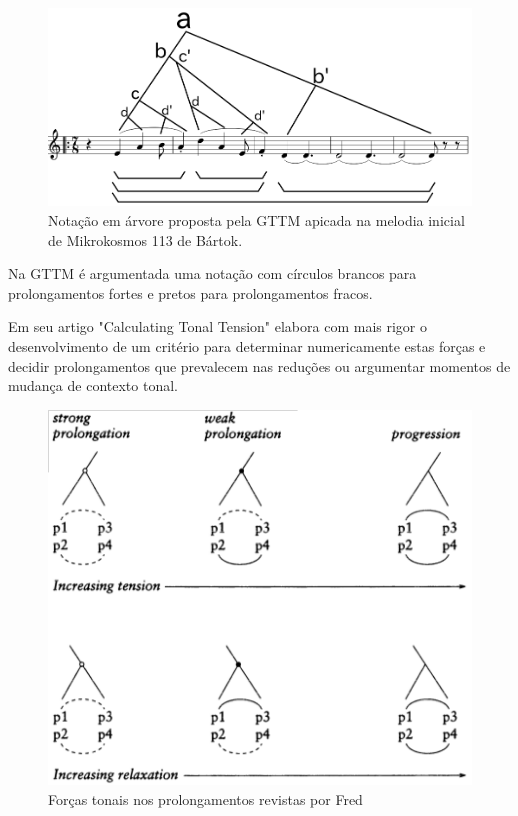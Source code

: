 \documentclass[
	12pt,				%
	openright,			%
	twoside,			%
	a4paper,			%
	english,			%
	french,				%
	spanish,			%
	brazil				%
	]{abntex2}
\begin{document}
\begin{figure}[!h]
	\caption{\label{fig_grafico}Notação em árvore proposta pela GTTM apicada na melodia inicial de Mikrokosmos 113 de Bártok.}
	\begin{center}
	    \includegraphics[scale=0.45]{mikro/mikro113_GTTM_tree.png}
	\end{center}
\end{figure}


\pagebreak
Na GTTM\cite[pg. 182]{lerdahl1983generative} é argumentada uma notação com círculos brancos para prolongamentos fortes e pretos para prolongamentos fracos. 

Em seu artigo "Calculating Tonal Tension"\cite{lerdahl1996calculating} elabora com mais rigor o desenvolvimento de um critério para determinar numericamente estas forças e decidir prolongamentos que prevalecem nas reduções ou argumentar momentos de mudança de contexto tonal. 

\begin{figure}[htb]
	\caption{\label{fig_grafico}Forças tonais nos prolongamentos revistas por Fred  }
	\begin{center}
	    \includegraphics[scale=0.6]{lerdahl/prolongation_calculating.png}
	\end{center}
\end{figure}
\end{document}
